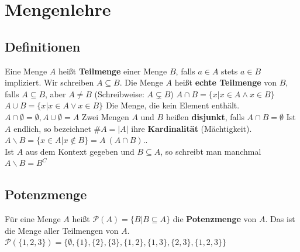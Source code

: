  
\chapter{Mengenlehre}

\section{Definitionen}
 {
	Eine Menge $A$ heißt \textbf{Teilmenge} einer Menge $B$, falls $a \in A$ stets $a \in B$ impliziert. Wir schreiben $A \subseteq B$. Die Menge $A$ heißt \textbf{echte Teilmenge} von $B$, falls $A \subseteq B$, aber $A \neq B$ (Schreibweise: $A \subsetneq B$)
}
 {
	$A \cap B = \{x \vert x \in A \land x \in B\}$
}
 {
	$A \cup B = \{x \vert x \in A \lor x \in B\}$
}
 {
	Die Menge, die kein Element enthält.
}
 {
	$A\cap \emptyset = \emptyset, A \cup \emptyset = A$
}
 {
	Zwei Mengen $A$ und $B$ heißen \textbf{disjunkt}, falls $A \cap B = \emptyset$
}
 {
	Ist $A$ endlich, so bezeichnet $\#A=\vert A \vert$ ihre \textbf{Kardinalität} (Mächtigkeit).
}
 {
	$A \backslash B = \{x \in A \vert x \notin B\} = A \ (A \cap B).$. \\
	Ist $A$ aus dem Kontext gegeben und $B \subseteq A$, so schreibt man manchmal $A \backslash B = B^C$
}
\section{Potenzmenge}
 {
	Für eine Menge $A$ heißt $\mathcal{P}(A) = \{B \vert B \subseteq A\}$ die \textbf{Potenzmenge} von $A$. Das ist die Menge aller Teilmengen von $A$.
}
 {
	$\mathcal{P}(\{1, 2, 3\}) = \{\emptyset, \{1\}, \{2\}, \{3\}, \{1, 2\}, \{1, 3\}, \{2, 3\}, \{1, 2, 3\}\}$
}
